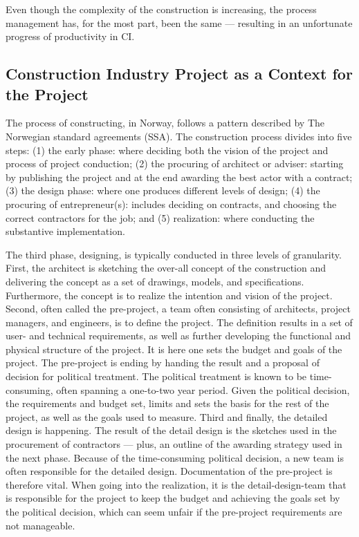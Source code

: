 Even though the complexity of the construction is increasing, the process management has, for the most part, been the same — resulting in an unfortunate progress of productivity in CI. 

\subsection{Construction Industry Project as a Context for the Project} \label{sec:CI_context}
The process of constructing, in Norway, follows a pattern described by The Norwegian standard agreements (SSA). The construction process divides into five steps: (1) the early phase: where deciding both the vision of the project and process of project conduction; (2) the procuring of architect or adviser: starting by publishing the project and at the end awarding the best actor with a contract; (3) the design phase: where one produces different levels of  design; (4) the procuring of entrepreneur(s): includes deciding on contracts, and choosing the correct contractors for the job; and (5) realization: where conducting the substantive implementation. 

The third phase, designing, is typically conducted in three levels of granularity. First, the architect is sketching the over-all concept of the construction and delivering the concept as a set of drawings, models, and specifications. Furthermore, the concept is to realize the intention and vision of the project. Second, often called the pre-project, a team often consisting of architects, project managers, and engineers, is to define the project. The definition results in a set of user- and technical requirements, as well as further developing the functional and physical structure of the project. It is here one sets the budget and goals of the project. The pre-project is ending by handing the result and a proposal of decision for political treatment. The political treatment is known to be time-consuming, often spanning a one-to-two year period. Given the political decision, the requirements and budget set, limits and sets the basis for the rest of the project, as well as the goals used to measure. Third and finally, the detailed design is happening. The result of the detail design is the sketches used in the procurement of contractors — plus, an outline of the awarding strategy used in the next phase. Because of the time-consuming political decision, a new team is often responsible for the detailed design. Documentation of the pre-project is therefore vital. When going into the realization, it is the detail-design-team that is responsible for the project to keep the budget and achieving the goals set by the political decision, which can seem unfair if the pre-project requirements are not manageable.


